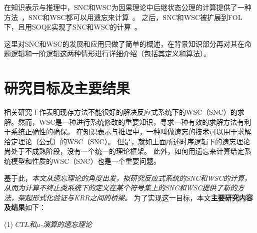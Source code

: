 在知识表示与推理中，SNC和WSC为因果理论中后继状态公理的计算提供了一种方法~\cite{lin2003compiling}，SNC和WSC都可以用遗忘来计算~\cite{DBLP:Lin:AIJ:2001,DBLP:conf/ijcai/DohertyLS01}。
之后，SNC和WSC被扩展到FOL下，且用SOQE实现了SNC和WSC的计算~\cite{DBLP:conf/ijcai/DohertyLS01}。

这里对SNC和WSC的发展和应用只做了简单的概述，在背景知识部分再对其在命题逻辑和一阶逻辑这两种情形进行详细介绍（包括其定义和算法）。






\section{研究目标及主要结果}

相关研究工作表明现存方法不能很好的解决反应式系统下的WSC（SNC）的求解。然而，WSC是一种进行系统修改的重要知识，寻求一种有效的求解方法有利于系统正确性的确保。
在知识表示与推理中，一种叫做遗忘的技术可以用于求解给定理论（公式）的WSC（SNC）。
但是，就如上面所述时序逻辑下的遗忘理论尚处于不成熟阶段，没有一个统一的理论框架。
此外，如何用遗忘来计算给定系统模型和性质的WSC（SNC）也是一个重要问题。

基于此，{\em 本文从遗忘理论的角度出发，拟研究反应式系统的SNC和WSC的计算，从而为计算不终止类系统下的定义在某个符号集上的SNC和WSC提供了新的方法，架起形式化验证与KRR之间的桥梁。}
为了实现这一目标，本文\textbf{主要研究内容及结果}如下：

(1) {\em $CTL$和$\mu$-演算的遗忘理论}

